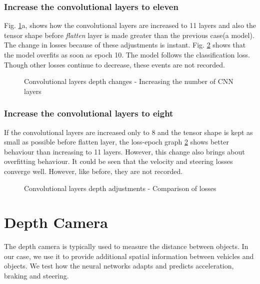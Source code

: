 \subsubsection*{Increase the convolutional layers to eleven}
Fig. \ref{fig:convlayerschange2}a, shows how the convolutional layers are increased to 11
layers and also the tensor shape before \textit{flatten} layer is made greater than the
previous case(a model). The change in losses because of these adjustments is instant.
Fig. \ref{fig:convlayerslosses2} shows that the model overfits as soon as epoch 10. The
model follows the classification loss. Though other losses continue to decrease, these
events are not recorded.
\begin{figure}[!ht]
    \def\svgwidth{\textwidth}
    \caption{Convolutional layers depth changes - Increasing the number of CNN layers}
    \label{fig:convlayerschange2}
\end{figure}
\subsubsection*{Increase the convolutional layers to eight}
If the convolutional layers are increased only to 8 and the tensor shape is kept as small
as possible before flatten layer, the loss-epoch graph \ref{fig:convlayerslosses2} shows
better behaviour than increasing to 11 layers. However, this change also brings about
overfitting behaviour. It could be seen that the velocity and steering losses converge
well. However, like before, they are not recorded.
\begin{figure}[!ht]
    \centering
    \def\svgwidth{\textwidth}
    \caption{Convolutional layers depth adjustments - Comparison of losses}
    \label{fig:convlayerslosses2}
\end{figure}
\section{Depth Camera}
The depth camera is typically used to measure the distance between objects. In our case,
we use it to provide additional spatial information between vehicles and objects. We test
how the neural networks adapts and predicts acceleration, braking and steering.

